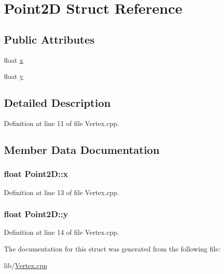 \hypertarget{struct_point2_d}{}\section{Point2D Struct Reference}
\label{struct_point2_d}
\subsection*{Public Attributes}
\begin{DoxyCompactItemize}
\item 
float \hyperlink{struct_point2_d_a2a5ef0ad00bc9e912a9aefcedf004cc4}{x}
\item 
float \hyperlink{struct_point2_d_a989485fd2d8026ceec5d57e8c7e629ab}{y}
\end{DoxyCompactItemize}


\subsection{Detailed Description}


Definition at line 11 of file Vertex.\+cpp.



\subsection{Member Data Documentation}
\subsubsection[{\texorpdfstring{x}{x}}]{\setlength{\rightskip}{0pt plus 5cm}float Point2\+D\+::x}\hypertarget{struct_point2_d_a2a5ef0ad00bc9e912a9aefcedf004cc4}{}\label{struct_point2_d_a2a5ef0ad00bc9e912a9aefcedf004cc4}


Definition at line 13 of file Vertex.\+cpp.

\subsubsection[{\texorpdfstring{y}{y}}]{\setlength{\rightskip}{0pt plus 5cm}float Point2\+D\+::y}\hypertarget{struct_point2_d_a989485fd2d8026ceec5d57e8c7e629ab}{}\label{struct_point2_d_a989485fd2d8026ceec5d57e8c7e629ab}


Definition at line 14 of file Vertex.\+cpp.



The documentation for this struct was generated from the following file\+:\begin{DoxyCompactItemize}
\item 
lib/\hyperlink{_vertex_8cpp}{Vertex.\+cpp}\end{DoxyCompactItemize}
